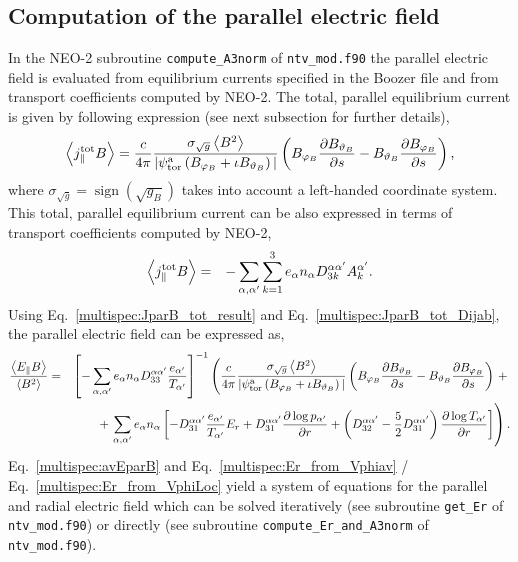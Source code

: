 \documentclass[preprint,prb,aps]{revtex4-1}
\DeclareMathOperator{\sign}{sign}
\newcommand{\be}[1]{\begin{equation} \label{#1}}
\newcommand{\ee}{\end{equation}}
\newcommand{\bea}[1]{\begin{eqnarray} \label{#1}}
\newcommand{\eea}{\end{eqnarray}}
\newcommand{\non}{\nonumber\\}
\newcommand{\difp}[2]{\frac{\partial #1}{\partial #2}}
\newcommand{\ph}{{\varphi}}
\newcommand{\tht}{\vartheta}
\begin{document}
\subsection{Computation of the parallel electric field}
In the NEO-2 subroutine \verb|compute_A3norm| of \verb|ntv_mod.f90|
the parallel electric field is evaluated from equilibrium currents
specified in the Boozer file and from transport coefficients computed by NEO-2.
The total, parallel equilibrium current is given by following expression
(see next subsection for further details),
\be{multispec:JparB_tot_result}
\left\langle j_\parallel^{\rm tot} B \right\rangle =
\frac{c}{4 \pi} \frac{\sigma_{\sqrt{g}} \left\langle B^2 \right\rangle}
{|\psi_{\rm tor}^{\rm a} \left(B_{\ph_B} + \iota B_{\tht_B}\right)|}
\left(B_{\ph_B} \difp{B_{\tht_B}}{s} -  B_{\tht_B} \difp{B_{\ph_B}}{s}\right),
\ee
where $\sigma_{\sqrt{g}}=\sign(\sqrt{g_B})$ takes into account a
left-handed coordinate system.
This total, parallel equilibrium current can be also expressed in terms of
transport coefficients computed by NEO-2,
\bea{multispec:JparB_tot_Dijab}
\left\langle j_\parallel^{\rm tot} B \right\rangle
&=&
-  \sum\limits_{\alpha,\alpha'} \sum\limits_{k=1}^{3}
e_\alpha n_\alpha D_{3k}^{\alpha\alpha'} A_k^{\alpha'}.
\eea
Using Eq.~\eqref{multispec:JparB_tot_result} and Eq.~\eqref{multispec:JparB_tot_Dijab},
the parallel electric field can be expressed as,
\bea{multispec:avEparB}
\frac{\left\langle E_\parallel B \right\rangle}{\left\langle B^2 \right\rangle}
&=&
\left[
-\sum\limits_{\alpha,\alpha'} e_\alpha n_\alpha
D_{33}^{\alpha\alpha'} \frac{e_{\alpha'}}{T_{\alpha'}}
\right]^{-1}
\left(
\frac{c}{4 \pi} \frac{\sigma_{\sqrt{g}} \left\langle B^2 \right\rangle}
{|\psi_{\rm tor}^{\rm a} \left(B_{\ph_B} + \iota B_{\tht_B}\right)|}
\left(B_{\ph_B} \difp{B_{\tht_B}}{s} -  B_{\tht_B} \difp{B_{\ph_B}}{s}\right)
\right. +{} \non
& & {}+
\left.
\sum\limits_{\alpha,\alpha'} e_\alpha n_\alpha
\left[
-D_{31}^{\alpha\alpha'} \frac{e_{\alpha'}}{T_{\alpha'}} E_r +
D_{31}^{\alpha\alpha'} \difp{\log p_{\alpha'}}{r} +
\left(D_{32}^{\alpha\alpha'}-\frac{5}{2}D_{31}^{\alpha\alpha'}\right)
\difp{\log T_{\alpha'}}{r}
\right]
\right).
\eea
Eq.~\eqref{multispec:avEparB} and Eq.~\eqref{multispec:Er_from_Vphiav} /
Eq.~\eqref{multispec:Er_from_VphiLoc} yield a system of equations
for the parallel and radial electric field which can be solved
iteratively (see subroutine \verb|get_Er| of \verb|ntv_mod.f90|)
or directly (see subroutine \verb|compute_Er_and_A3norm| of \verb|ntv_mod.f90|).

\end{document}
